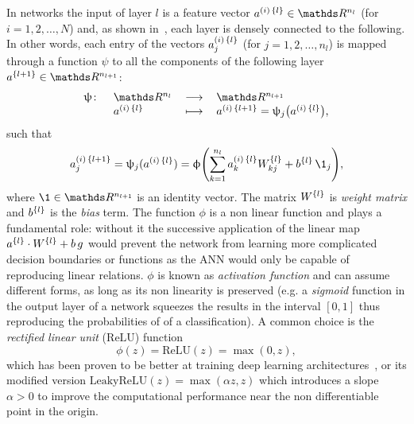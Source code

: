 In \fc networks the input of layer $l$ is a feature vector $a^{(i)\, \qty{l}} \in \R^{n_l}$ (for $i = 1, 2, \dots, N$) and, as shown in~, each layer is densely connected to the following.\footnotemark{}
In other words, each entry of the vectors $a^{(i)\, \qty{l}}_j$ (for $j = 1, 2, \dots, n_l$) is mapped through a function $\psi$ to all the components of the following layer $a^{\qty{l+1}} \in \R^{n_{l+1}}$:
\begin{equation}
  \centering
  \begin{tabular}{@{}rlll@{}}
    $\psi\colon$ & $\R^{n_l}$ & $\longrightarrow$ & $\R^{n_{l+1}}$
    \\
               & $a^{\qty(i)\, \qty{l}}$ & $\longmapsto$ & $a^{\qty(i)\, \qty{l+1}} = \psi_j\qty( a^{\qty(i)\, \qty{l}} )$,
    \\
  \end{tabular}
\end{equation}
such that
\begin{equation}
  a^{(i)\, \qty{l+1}}_j
  =
  \psi_j( a^{(i)\, \qty{l}} )
  =
  \phi\qty( \finitesum{k}{1}{n_l} a^{(i)\, \qty{l}}_k W^{\qty{l}}_{kj} + b^{\qty{l}}\, \1_{j} ),
\end{equation}
where $\1 \in \R^{n_{l+1}}$ is an identity vector.
The matrix $W^{\qty{l}}$ is \textit{weight matrix} and $b^{\qty{l}}$ is the \textit{bias} term.
The function $\phi$ is a non linear function and plays a fundamental role: without it the successive application of the linear map $a^{\qty{l}} \cdot W^{\qty{l}} + b\, g$ would prevent the network from learning more complicated decision boundaries or functions as the ANN would only be capable of reproducing linear relations.
$\phi$ is known as \textit{activation function} and can assume different forms, as long as its non linearity is preserved (e.g. a \textit{sigmoid} function in the output layer of a network squeezes the results in the interval $[0, 1]$ thus reproducing the probabilities of of a classification).
A common choice is the \textit{rectified linear unit} ($\mathrm{ReLU}$) function
\begin{equation}
  \phi( z ) = \mathrm{ReLU}( z ) = \max( 0, z ),
\end{equation}
which has been proven to be better at training deep learning architectures~\cite{Glorot:2011:DeepSparseRectifier}, or its modified version $\mathrm{LeakyReLU}( z ) = \max( \alpha z, z )$ which introduces a slope $\alpha > 0$ to improve the computational performance near the non differentiable point in the origin.

